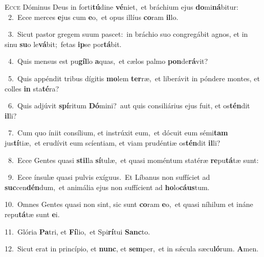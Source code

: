 \lettrine{\initial\textcolor{\initialcolor}{E}}{cce} Dóminus Deus in forti\-\textbf{tú}\-dine \textbf{vé}\-niet,~\star et bráchium ejus \textbf{do}\-mi\-\textbf{ná}\-bitur:\\
{\numbfont\textcolor{\numbcolor}{~2.}}~Ecce merces \textbf{e}\-jus cum \textbf{e}\-o,~\star et opus illíus \textbf{co}\-ram \textbf{il}\-lo.\par
{\numbfont\textcolor{\numbcolor}{~3.}}~Sicut pastor gregem suum pascet:~\dagger in bráchio suo congregábit agnos, et in sinu \textbf{su}\-o le\-\textbf{vá}\-bit;~\star fetas \textbf{ip}\-se por\-\textbf{tá}\-bit.\par
{\numbfont\textcolor{\numbcolor}{~4.}}~Quis mensus est pu\-\textbf{gíl}\-lo \textbf{a}\-quas,~\star et cælos palmo \textbf{pon}\-de\-\textbf{rá}\-vit?\par
{\numbfont\textcolor{\numbcolor}{~5.}}~Quis appéndit tribus dígitis \textbf{mo}\-lem \textbf{ter}\-ræ,~\star et liberávit in póndere montes, et colles \textbf{in} sta\-\textbf{té}\-ra?\par
{\numbfont\textcolor{\numbcolor}{~6.}}~Quis adjúvit \textbf{spí}\-ritum \textbf{Dó}\-mini?~\star aut quis consiliárius ejus fuit, et os\-\textbf{tén}\-dit \textbf{il}\-li?\par
{\numbfont\textcolor{\numbcolor}{~7.}}~Cum quo íniit consílium, et instrúxit eum,~\dagger et dócuit eum sémi\textbf{tam} jus\-\textbf{tí}\-tiæ,~\star et erudívit eum scíentiam, et viam prudéntiæ os\-\textbf{tén}\-dit \textbf{il}\-li?\par
{\numbfont\textcolor{\numbcolor}{~8.}}~Ecce Gentes quasi \textbf{stil}\-la \textbf{sí}\-tulæ,~\star et quasi moméntum statéræ \textbf{re}\-pu\-\textbf{tá}\-tæ sunt:\par
{\numbfont\textcolor{\numbcolor}{~9.}}~Ecce ínsulæ quasi pulvis exíguus.~\dagger Et Líbanus non suffíciet ad \textbf{suc}\-cen\-\textbf{dén}\-dum,~\star et animália ejus non suffícient ad \textbf{ho}\-lo\-\textbf{cáus}\-tum.\par
{\numbfont\textcolor{\numbcolor}{10.}}~Omnes Gentes quasi non sint, sic sunt \textbf{co}\-ram \textbf{e}\-o,~\star et quasi níhilum et ináne repu\-\textbf{tá}\-tæ sunt \textbf{e}\-i.\par
{\numbfont\textcolor{\numbcolor}{11.}}~Glória \textbf{Pa}\-tri, et \textbf{Fí}\-lio,~\star et Spi\-\textbf{rí}\-tui \textbf{Sanc}\-to.\par
{\numbfont\textcolor{\numbcolor}{12.}}~Sicut erat in princípio, et \textbf{nunc}\-, et \textbf{sem}\-per,~\star et in sǽcula sæcu\-\textbf{ló}\-rum. \textbf{A}\-men.\par
